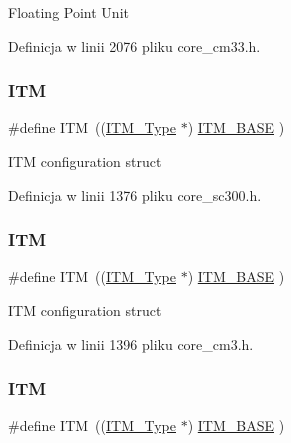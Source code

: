 Floating Point Unit 

Definicja w linii 2076 pliku core\+\_\+cm33.\+h.

\mbox{\label{group___c_m_s_i_s__core__base_gabae7cdf882def602cb787bb039ff6a43}} 
\subsubsection{\texorpdfstring{I\+TM}{ITM}\hspace{0.1cm}{\footnotesize\ttfamily [1/6]}}
{\footnotesize\ttfamily \#define I\+TM~((\hyperlink{struct_i_t_m___type}{I\+T\+M\+\_\+\+Type}       $\ast$)     \hyperlink{group___c_m_s_i_s__core__base_gadd76251e412a195ec0a8f47227a8359e}{I\+T\+M\+\_\+\+B\+A\+SE}      )}

I\+TM configuration struct 

Definicja w linii 1376 pliku core\+\_\+sc300.\+h.

\mbox{\label{group___c_m_s_i_s__core__base_gabae7cdf882def602cb787bb039ff6a43}} 
\subsubsection{\texorpdfstring{I\+TM}{ITM}\hspace{0.1cm}{\footnotesize\ttfamily [2/6]}}
{\footnotesize\ttfamily \#define I\+TM~((\hyperlink{struct_i_t_m___type}{I\+T\+M\+\_\+\+Type}       $\ast$)     \hyperlink{group___c_m_s_i_s__core__base_gadd76251e412a195ec0a8f47227a8359e}{I\+T\+M\+\_\+\+B\+A\+SE}      )}

I\+TM configuration struct 

Definicja w linii 1396 pliku core\+\_\+cm3.\+h.

\mbox{\label{group___c_m_s_i_s__core__base_gabae7cdf882def602cb787bb039ff6a43}} 
\subsubsection{\texorpdfstring{I\+TM}{ITM}\hspace{0.1cm}{\footnotesize\ttfamily [3/6]}}
{\footnotesize\ttfamily \#define I\+TM~((\hyperlink{struct_i_t_m___type}{I\+T\+M\+\_\+\+Type}       $\ast$)     \hyperlink{group___c_m_s_i_s__core__base_gadd76251e412a195ec0a8f47227a8359e}{I\+T\+M\+\_\+\+B\+A\+SE}      )}

